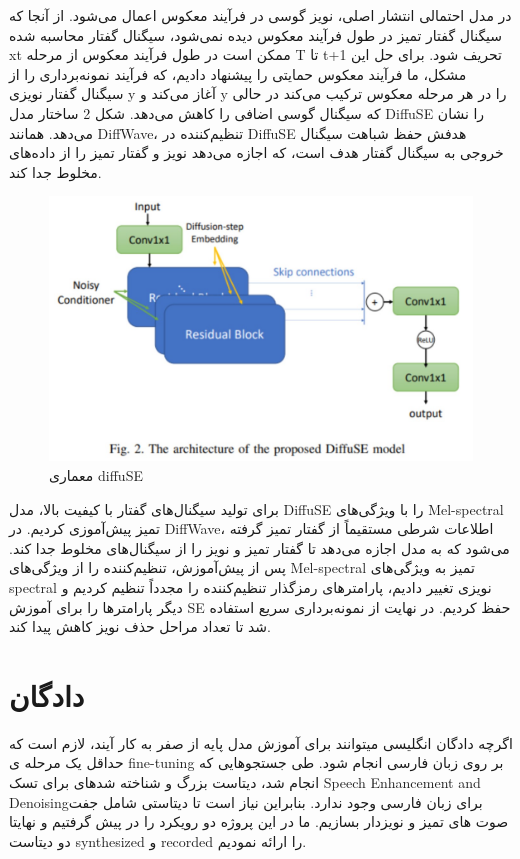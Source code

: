 \documentclass[fleqn]{report}
\begin{document}
در مدل احتمالی انتشار اصلی، نویز گوسی در فرآیند معکوس اعمال می‌شود. از آنجا که سیگنال گفتار تمیز در طول فرآیند معکوس دیده نمی‌شود، سیگنال گفتار محاسبه شده  xt​ ممکن است در طول فرآیند معکوس از مرحله T تا t+1 تحریف شود. برای حل این مشکل، ما فرآیند معکوس حمایتی را پیشنهاد دادیم، که فرآیند نمونه‌برداری را از سیگنال گفتار نویزی y آغاز می‌کند و y را در هر مرحله معکوس ترکیب می‌کند در حالی که سیگنال گوسی اضافی را کاهش می‌دهد.
شکل 2 ساختار مدل DiffuSE را نشان می‌دهد. همانند DiffWave، تنظیم‌کننده در DiffuSE هدفش حفظ شباهت سیگنال خروجی به سیگنال گفتار هدف است، که اجازه می‌دهد نویز و گفتار تمیز را از داده‌های مخلوط جدا کند. 

\begin{figure}[h]

    \centering
    \includegraphics[width=.6\textwidth, keepaspectratio]{images/diffuSE.jpg}
    
    \caption{معماری diffuSE}
    \label{fig:diffuSE}
\end{figure}

برای تولید سیگنال‌های گفتار با کیفیت بالا، مدل DiffuSE را با ویژگی‌های Mel-spectral تمیز پیش‌آموزی کردیم. در DiffWave، اطلاعات شرطی مستقیماً از گفتار تمیز گرفته می‌شود که به مدل اجازه می‌دهد تا گفتار تمیز و نویز را از سیگنال‌های مخلوط جدا کند. پس از پیش‌آموزش، تنظیم‌کننده را از ویژگی‌های Mel-spectral تمیز به ویژگی‌های spectral نویزی تغییر دادیم، پارامترهای رمزگذار تنظیم‌کننده را مجدداً تنظیم کردیم و دیگر پارامترها را برای آموزش SE حفظ کردیم. در نهایت از نمونه‌برداری سریع استفاده شد تا تعداد مراحل حذف نویز کاهش پیدا کند.

\chapter{دادگان}
اگرچه دادگان انگلیسی میتوانند برای آموزش مدل پایه از صفر به کار آیند، لازم است که حداقل یک مرحله ی 
fine-tuning بر روی زبان فارسی انجام شود. طی جستجوهایی که انجام شد، دیتاست بزرگ و شناخته شدهای برای تسک  
 Speech Enhancement and Denoisingبرای زبان فارسی وجود ندارد. بنابراین نیاز است
  تا دیتاستی شامل جفت صوت های تمیز و نویزدار بسازیم. 
  ما در این پروژه دو رویکرد را در پیش گرفتیم و 
  نهایتا دو دیتاست synthesized و recorded را ارائه نمودیم.
\end{document}
